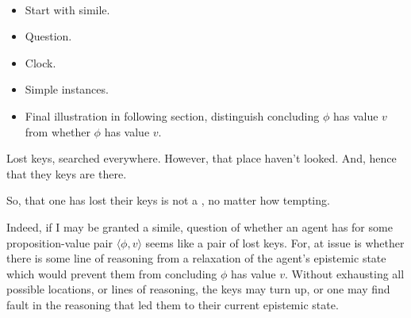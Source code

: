 \paragraph{}
\label{sec:ideaS:illus}

\begin{note}
  \begin{itemize}
  \item Start with simile.
  \item Question.
  \item Clock.
  \item Simple instances.
  \item Final illustration in following section, distinguish concluding \(\phi\) has value \(v\) from whether \(\phi\) has value \(v\).
\end{itemize}
\end{note}

\begin{note}
  \begin{illustration}
    Lost keys, searched everywhere.
    However, \epVAd{} that place haven't looked.
    And, hence \epVAd{} that they keys are there.
  \end{illustration}
  So, that one has lost their keys is not a \sink{}, no matter how tempting.

  Indeed, if I may be granted a simile, question of whether an agent has \support{} for some proposition-value pair \(\langle \phi, v \rangle\) seems like a pair of lost keys.
  For, at issue is whether there is some line of reasoning from a relaxation of the agent's epistemic state which would prevent them from concluding \(\phi\) has value \(v\).
  Without exhausting all possible locations, or lines of reasoning, the keys may turn up, or one may find fault in the reasoning that led them to their current epistemic state.
\end{note}

